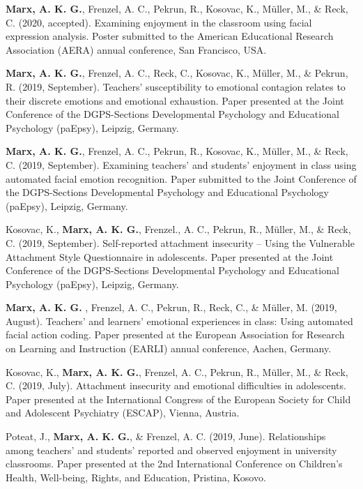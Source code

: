 \documentclass[letterpaper]{article}
\renewenvironment{itemize}{ %
  \begin{list}{}{ %
    \setlength{\leftmargin}{2.5em} %
  }
}{
  \end{list}
}
\begin{document}
\begin{itemize}
\item {\bf Marx, A. K. G.}, Frenzel, A. C., Pekrun, R., Kosovac, K., Müller, M., \& Reck, C. (2020, accepted). Examining enjoyment in the classroom using facial expression analysis. Poster submitted to the American Educational Research Association (AERA) annual conference, San Francisco, USA.
\item {\bf Marx, A. K. G.}, Frenzel, A. C., Reck, C., Kosovac, K., Müller, M., \& Pekrun, R. (2019, September). Teachers’ susceptibility to emotional contagion relates to their discrete emotions and emotional exhaustion. Paper presented at the Joint Conference of the DGPS-Sections Developmental Psychology and Educational Psychology (paEpsy), Leipzig, Germany.
\item {\bf Marx, A. K. G.}, Frenzel, A. C., Pekrun, R., Kosovac, K., Müller, M., \& Reck, C. (2019, September). Examining teachers’ and students’ enjoyment in class using automated facial emotion recognition. Paper submitted to the Joint Conference of the DGPS-Sections Developmental Psychology and Educational Psychology (paEpsy), Leipzig, Germany.
\item Kosovac, K., {\bf Marx, A. K. G.}, Frenzel., A. C., Pekrun, R., Müller, M., \& Reck, C. (2019, September). Self-reported attachment insecurity – Using the Vulnerable Attachment Style Questionnaire in adolescents. Paper presented at the Joint Conference of the DGPS-Sections Developmental Psychology and Educational Psychology (paEpsy), Leipzig, Germany.
\item {\bf Marx, A. K. G. }, Frenzel, A. C., Pekrun, R., Reck, C., \& Müller, M. (2019, August). Teachers’ and learners’ emotional experiences in class: Using automated facial action coding. Paper presented at the European Association for Research on Learning and Instruction (EARLI) annual conference, Aachen, Germany.
\item Kosovac, K., {\bf Marx, A. K. G.}, Frenzel, A. C., Pekrun, R., Müller, M., \& Reck, C. (2019, July). Attachment insecurity and emotional difficulties in adolescents. Paper presented at the International Congress of the European Society for Child and Adolescent Psychiatry (ESCAP), Vienna, Austria.
\item Poteat, J., {\bf Marx, A. K. G.}, \& Frenzel, A. C. (2019, June). Relationships among teachers' and students' reported and observed enjoyment in university classrooms. Paper presented at the 2nd International Conference on Children's Health, Well-being, Rights, and Education, Pristina, Kosovo.

\end{itemize}
\end{document}
